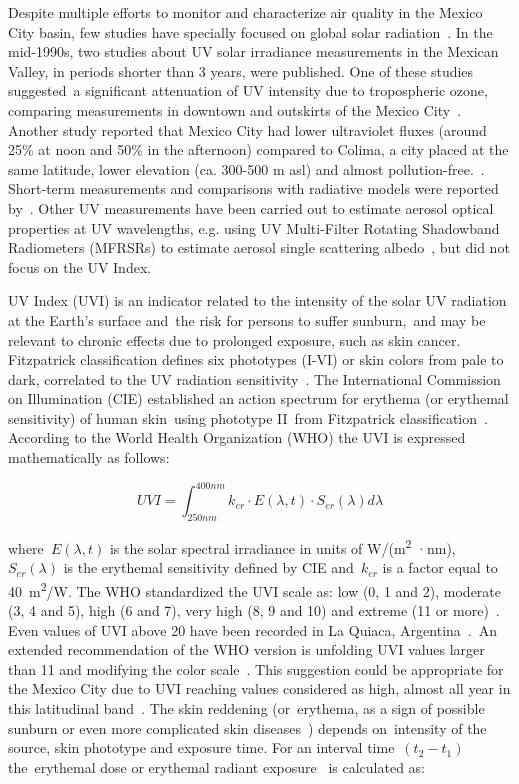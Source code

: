 \documentclass{article}
\begin{document}
Despite multiple efforts to monitor and characterize air quality in the
Mexico City basin, few studies have specially focused on global solar
radiation~\cite{valdes1991,Qui_ones_2014,Matsumoto_2014}. In the mid-1990s, two studies about UV
solar irradiance measurements in the Mexican Valley, in periods shorter
than 3 years, were published. One of these studies suggested~a
significant attenuation of UV intensity due to tropospheric ozone,
comparing measurements in downtown and outskirts of the Mexico
City~\cite{Acosta_2000}. Another study reported that Mexico City had
lower ultraviolet fluxes (around 25\% at noon and 50\% in the afternoon)
compared to Colima, a city placed at the same latitude, lower elevation
(ca. 300-500 m asl) and almost pollution-free.~\cite{Galindo_1995}.
Short-term measurements and comparisons with radiative models were
reported by~\cite{Palancar_2012}. Other UV measurements have been carried
out to estimate aerosol optical properties at UV wavelengths, e.g. using
UV Multi-Filter Rotating Shadowband Radiometers (MFRSRs) to estimate
aerosol single scattering albedo~\cite{Goering_2005,Corr_2009}, but did not focus
on the UV Index. ~

UV Index (UVI) is an indicator related to the intensity of the solar UV
radiation at the Earth's surface and~the risk for persons to suffer
sunburn,~and may be relevant to chronic effects due to prolonged
exposure, such as skin cancer. Fitzpatrick classification defines six
phototypes (I-VI) or skin colors from pale to dark, correlated to the UV
radiation sensitivity~\cite{kukita1974}. The International Commission
on Illumination (CIE) established an action spectrum for erythema (or
erythemal sensitivity) of human skin~using phototype II~from Fitzpatrick
classification~\cite{organization2014}. According to the World Health
Organization (WHO) the UVI is expressed mathematically as follows:

\begin{equation}
UVI=\int_{250nm}^{400nm}k_{er}\cdot E(\lambda,t)\cdot S_{er}\left(\lambda\right)d\lambda
\end{equation}

where\emph{~\(E\left(\lambda,t\right)\)} is the solar spectral irradiance in
units of W/(m\textsuperscript{2} ·nm),~\emph{~\(S_{er}\left(\lambda\right)\)} is the
erythemal sensitivity defined by CIE and~\(k_{er}\) is a factor
equal to 40~m\textsuperscript{2}/W. The WHO standardized the UVI scale
as: low (0, 1 and 2), moderate (3, 4 and 5), high (6 and 7), very high
(8, 9 and 10) and extreme (11 or more)~\cite{2002}. Even values
of UVI above 20 have been recorded in La Quiaca,
Argentina~\cite{Cede_2002}.~An extended recommendation of the WHO
version is unfolding UVI values larger than 11 and modifying the color
scale~\cite{Zaratti_2014}. This suggestion could be appropriate for the
Mexico City due to UVI reaching values considered as high, almost all
year in this latitudinal band~\cite{Tanskanen_2006,Herman_2010}. The skin reddening
(or~erythema, as a sign of possible sunburn or even more complicated
skin diseases~\cite{kukita1974}) depends on~intensity of the source,
skin phototype and exposure time. For an interval
time~\((t_2-t_1)\) the~erythemal dose or erythemal radiant
exposure~\cite{Braslavsky_2007} is calculated as:
\end{document}

